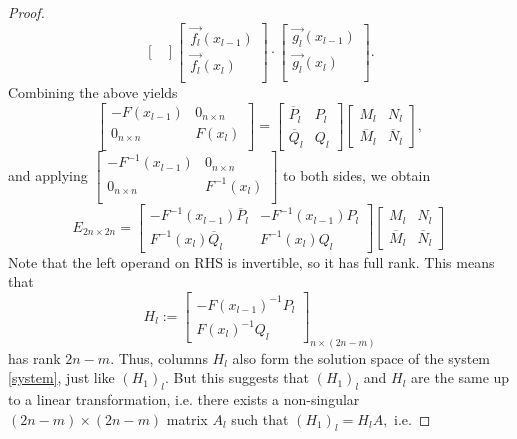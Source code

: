 \documentclass[11pt,reqno,oneside,a4paper]{article}
\theoremstyle{plain} %
\theoremstyle{definition}
\theoremstyle{remark}
\begin{document}
\begin{proof}
\[\begin{bmatrix}
\end{bmatrix}
\begin{bmatrix}
\vec{f_l}(x_{l-1})  \\
\vec{f_l}(x_{l})  \\
\end{bmatrix}
\cdot
\begin{bmatrix}
\vec{g_l}(x_{l-1})  \\
\vec{g_l}(x_{l})  \\
\end{bmatrix}.\]
Combining the above yields
\[ 
\begin{bmatrix}
- F(x_{l-1}) & 0_{n\times n} \\
0_{n\times n} &  F(x_{l}) \\
\end{bmatrix} = 
\begin{bmatrix}
\overline{P}_l & P_l \\
\overline{Q}_l & Q_l 
\end{bmatrix} 
\begin{bmatrix}
M_l & N_l  \\
\overline{M}_l & \overline{N}_l 
\end{bmatrix},
\]
and applying $\begin{bmatrix}
- F^{-1}(x_{l-1}) & 0_{n\times n} \\
0_{n\times n} &  F^{-1}(x_{l}) \\
\end{bmatrix}$ to both sides, we obtain
\[ 
E_{2n\times 2n}
= 
\begin{bmatrix}
- F^{-1}(x_{l-1})\overline{P}_l & - F^{-1}(x_{l-1})P_l \\
F^{-1}(x_{l}) \overline{Q}_l & F^{-1}(x_{l}) Q_l 
\end{bmatrix} 
\begin{bmatrix}
M_l & N_l  \\
\overline{M}_l & \overline{N}_l 
\end{bmatrix}
\]
Note that the left operand on RHS is invertible, so it has full rank. This means that 
\[ H_l := \begin{bmatrix}
-F(x_{l-1})^{-1} P_l \\
F(x_l)^{-1}Q_l
\end{bmatrix}_{n \times (2n -m)}
\]
has rank $2n -m.$ Thus, columns $H_l$ also form the solution space of the system \eqref{system}, just like $(H_1)_l.$ But this suggests that $(H_1)_l$ and $H_l$ are the same up to a linear transformation, i.e. there exists a non-singular $(2n-m)\times (2n-m)$ matrix $A_l$ such that $(H_1)_l = H_l A,$ i.e.

\end{proof}
\end{document}
